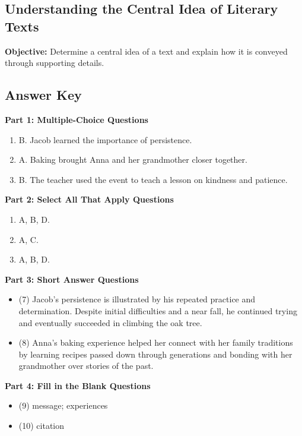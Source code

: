 \documentclass[12pt]{article}
\begin{document}
\subsection*{Understanding the Central Idea of Literary Texts}
\onehalfspacing

\begin{tcolorbox}[colframe=black!40, colback=gray!0, title=Learning Objective]
\textbf{Objective:} Determine a central idea of a text and explain how it is conveyed through supporting details.
\end{tcolorbox}


\subsection*{Answer Key}

\textbf{Part 1: Multiple-Choice Questions}
\begin{enumerate}[label=\arabic*.]
    \item B. Jacob learned the importance of persistence.  
    \item A. Baking brought Anna and her grandmother closer together.  
    \item B. The teacher used the event to teach a lesson on kindness and patience.  
\end{enumerate}

\textbf{Part 2: Select All That Apply Questions}
\begin{enumerate}[label=\arabic*.]
    \item A, B, D.  
    \item A, C.  
    \item A, B, D.  
\end{enumerate}

\textbf{Part 3: Short Answer Questions}
\begin{itemize}
    \item (7) Jacob’s persistence is illustrated by his repeated practice and determination. Despite initial difficulties and a near fall, he continued trying and eventually succeeded in climbing the oak tree.  
    \item (8) Anna’s baking experience helped her connect with her family traditions by learning recipes passed down through generations and bonding with her grandmother over stories of the past.  
\end{itemize}

\textbf{Part 4: Fill in the Blank Questions}
\begin{itemize}
    \item (9) message; experiences  
    \item (10) citation  
\end{itemize}
\end{document}

